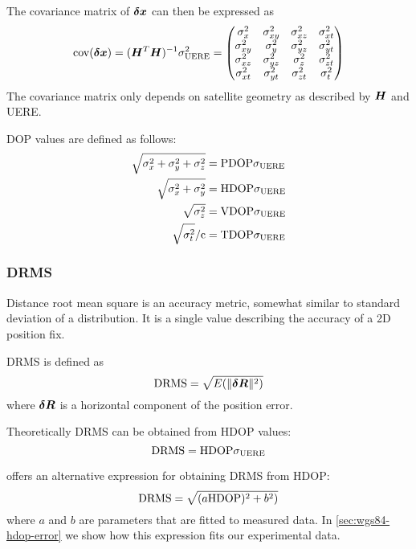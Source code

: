 The covariance matrix of \(\bm{\delta{}x}\) can then be expressed as
\begin{equation}
	\operatorname{\mathrm{cov}}(\bm{\delta{}x}) =
		(\bm{H}^T \bm{H})^{-1} \sigma^2_{\mathrm{UERE}} =
		\begin{pmatrix}
			\sigma^2_{x}  & \sigma^2_{xy} & \sigma^2_{xz} & \sigma^2_{xt} \\
			\sigma^2_{xy} & \sigma^2_{y}  & \sigma^2_{yz} & \sigma^2_{yt} \\
			\sigma^2_{xz} & \sigma^2_{yz} & \sigma^2_{z}  & \sigma^2_{zt} \\
			\sigma^2_{xt} & \sigma^2_{yt} & \sigma^2_{zt} & \sigma^2_{t}
		\end{pmatrix}
\end{equation}
The covariance matrix only depends on satellite geometry as described by \(\bm{H}\) and UERE.

DOP values are defined as follows:
\begin{subequations}
	\label{eq:dop-def}
\begin{align}
	\sqrt{\sigma^2_x + \sigma^2_y + \sigma^2_z} &= \mathrm{PDOP} \sigma_{\mathrm{UERE}} \\
	\sqrt{\sigma^2_x + \sigma^2_y} &= \mathrm{HDOP} \sigma_{\mathrm{UERE}} \\
	\sqrt{\sigma^2_z} &= \mathrm{VDOP} \sigma_{\mathrm{UERE}} \\
	\sqrt{\sigma^2_t} / \mathrm{c} &= \mathrm{TDOP} \sigma_{\mathrm{UERE}}
\end{align}
\end{subequations}

\subsubsection{DRMS}
Distance root mean square is an accuracy metric, somewhat similar to
standard deviation of a distribution.
It is a single value describing the accuracy of a 2D position fix.

DRMS is defined as
\begin{equation}
	\mathrm{DRMS} = \sqrt{E(\lVert\bm{\delta{}R}\rVert^2)}
\end{equation}
where \(\bm{\delta{}R}\) is a horizontal component of the position error.

Theoretically DRMS can be obtained from HDOP values:
\begin{equation}
	\mathrm{DRMS} = \mathrm{HDOP} \sigma_{\mathrm{UERE}}
\end{equation}

\cite{www-wilson} offers an alternative expression for obtaining
DRMS from HDOP:
\begin{equation}
	\mathrm{DRMS} = \sqrt{(a \mathrm{HDOP})^2 + b^2)}
\end{equation}
where \(a\) and \(b\) are parameters that are fitted to measured data.
In \cref{sec:wgs84-hdop-error} we show how this expression fits our experimental data.

